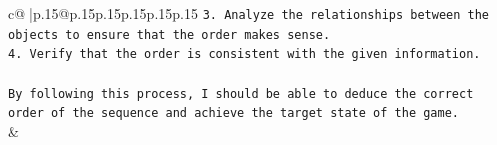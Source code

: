 \documentclass{article}
\begin{document}
{\begin{supertabular}{c@{$\;$}|p{.15\linewidth}@{}p{.15\linewidth}p{.15\linewidth}p{.15\linewidth}p{.15\linewidth}p{.15\linewidth}}
{{{\texttt{3. Analyze the relationships between the objects to ensure that the order makes sense.} \\
\texttt{4. Verify that the order is consistent with the given information.} \\
\\ 
\texttt{By following this process, I should be able to deduce the correct order of the sequence and achieve the target state of the game.} \\
            }
        }
    }
    & \\ \\

\end{supertabular}
}
\end{document}
